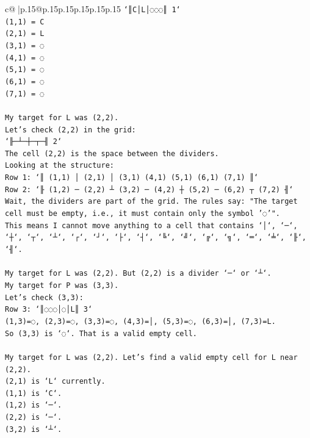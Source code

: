 \documentclass{article}
\begin{document}
{\begin{supertabular}{c@{$\;$}|p{.15\linewidth}@{}p{.15\linewidth}p{.15\linewidth}p{.15\linewidth}p{.15\linewidth}p{.15\linewidth}}
{{{\texttt{`║C│L│◌◌◌║ 1`} \\
\texttt{(1,1) = C} \\
\texttt{(2,1) = L} \\
\texttt{(3,1) = ◌} \\
\texttt{(4,1) = ◌} \\
\texttt{(5,1) = ◌} \\
\texttt{(6,1) = ◌} \\
\texttt{(7,1) = ◌} \\
\\ 
\texttt{My target for L was (2,2).} \\
\texttt{Let's check (2,2) in the grid:} \\
\texttt{`╟─┴─┼─┬─╢ 2`} \\
\texttt{The cell (2,2) is the space between the dividers.} \\
\texttt{Looking at the structure:} \\
\texttt{Row 1: `║ (1,1) │ (2,1) │ (3,1) (4,1) (5,1) (6,1) (7,1) ║`} \\
\texttt{Row 2: `╟ (1,2) ─ (2,2) ┴ (3,2) ─ (4,2) ┼ (5,2) ─ (6,2) ┬ (7,2) ╢`} \\
\texttt{Wait, the dividers are part of the grid. The rules say: "The target cell must be empty, i.e., it must contain only the symbol '◌'".} \\
\texttt{This means I cannot move anything to a cell that contains `│`, `─`, `┼`, `┬`, `┴`, `┌`, `┘`, `├`, `┤`, `╚`, `╝`, `╔`, `╗`, `═`, `╧`, `╟`, `╢`.} \\
\\ 
\texttt{My target for L was (2,2). But (2,2) is a divider `─` or `┴`.} \\
\texttt{My target for P was (3,3).} \\
\texttt{Let's check (3,3):} \\
\texttt{Row 3: `║◌◌◌│◌│L║ 3`} \\
\texttt{(1,3)=◌, (2,3)=◌, (3,3)=◌, (4,3)=│, (5,3)=◌, (6,3)=│, (7,3)=L.} \\
\texttt{So (3,3) is `◌`. That is a valid empty cell.} \\
\\ 
\texttt{My target for L was (2,2). Let's find a valid empty cell for L near (2,2).} \\
\texttt{(2,1) is `L` currently.} \\
\texttt{(1,1) is `C`.} \\
\texttt{(1,2) is `─`.} \\
\texttt{(2,2) is `─`.} \\
\texttt{(3,2) is `┴`.} \\
}}}
\end{supertabular}}
\end{document}
